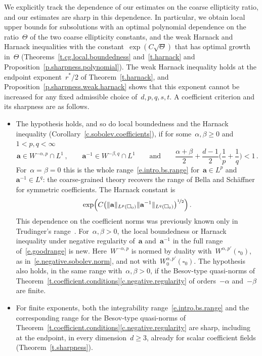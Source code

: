 \documentclass[11pt,letterpaper]{article}
\numberwithin{equation}{section}
\theoremstyle{definition}
\renewcommand{\a}{\mathbf{a}}
\newcommand{\nf}{\nicefrac}
\newcommand{\cu}{\square}
\DeclarePairedDelimiter{\norm}{\lVert}{\rVert}
\begin{document}
\smallskip

We explicitly track the dependence of our estimates on the coarse ellipticity ratio, and our estimates are sharp in this dependence. In particular, we obtain local upper bounds for subsolutions with an optimal polynomial dependence on the ratio~$\Theta$ of the two coarse ellipticity constants, and the weak Harnack and Harnack inequalities with the constant~$\exp(C\sqrt\Theta)$ that has optimal growth in~$\Theta$ (Theorems~\ref{t.cg.local.boundedness} and~\ref{t.harnack} and Proposition~\ref{p.sharpness.polynomial}). The weak Harnack inequality holds at the endpoint exponent~$r^*/2$ of Theorem~\ref{t.harnack}, and Proposition~\ref{p.sharpness.weak.harnack} shows that this exponent cannot be increased for any fixed admissible choice of~$d,p,q,s,t$. A coefficient criterion and its sharpness are as follows.
\begin{itemize}
\item The hypothesis holds, and so do local boundedness and the Harnack inequality (Corollary~\ref{c.sobolev.coefficients}), if for some~$\alpha,\beta\geq0$ and~$1<p,q<\infty$
\begin{equation}
	\a\in W^{-\alpha,p}\cap L^1\,,\qquad\a^{-1}\in W^{-\beta,q}\cap L^1\qquad\mbox{and}\qquad\frac{\alpha+\beta}{2}+\frac{d-1}{2}\biggl(\frac1p+\frac1q\biggr)<1\,.
	\label{e.goodrange}
\end{equation}
For~$\alpha=\beta=0$ this is the whole range~\eqref{e.intro.bs.range} for~$\a\in L^p$ and~$\a^{-1}\in L^q$: the coarse-grained theory recovers the range of Bella and Sch\"affner for symmetric coefficients. The Harnack constant is
\begin{equation*}
	\exp\Bigl(C\bigl(\norm{\a}_{L^p(\cu_0)}\norm{\a^{-1}}_{L^q(\cu_0)}\bigr)^{\nf12}\Bigr)\,.
\end{equation*}
This dependence on the coefficient norms was previously known only in Trudinger's range~\cite{AADKM}. For~$\alpha,\beta>0$, the local boundedness or Harnack inequality under negative regularity of~$\a$ and~$\a^{-1}$ in the full range of~\eqref{e.goodrange} is new. Here~$W^{-\alpha,p}$ is normed by duality with~$W^{\alpha,p'}(\cu_0)$, as in~\eqref{e.negative.sobolev.norm}, and not with~$W^{\alpha,p'}_0(\cu_0)$. The hypothesis also holds, in the same range with~$\alpha,\beta>0$, if the Besov-type quasi-norms of Theorem~\ref{t.coefficient.conditions}\ref{c.negative.regularity} of orders~$-\alpha$ and~$-\beta$ are finite.
\item For finite exponents, both the integrability range~\eqref{e.intro.bs.range} and the corresponding range for the Besov-type quasi-norms of Theorem~\ref{t.coefficient.conditions}\ref{c.negative.regularity} are sharp, including at the endpoint, in every dimension~$d\geq3$, already for scalar coefficient fields (Theorem~\ref{t.sharpness}).
\end{itemize}
\end{document}
